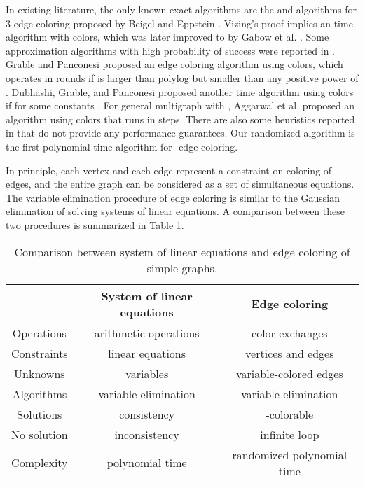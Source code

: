 \documentclass[11pt]{article}
\begin{document}
In existing literature, the only known exact algorithms are the  and  algorithms for 3-edge-coloring proposed by Beigel and Eppstein \cite{eppstein2001improved} \cite{beigel19953}. Vizing's proof implies an  time algorithm with  colors, which was later improved to  by Gabow et al. \cite{Gabowedgecoliring}. Some approximation algorithms with high probability of success were reported in \cite{grable1997nearly} \cite{dubhashi1998near} \cite{aggarwal2003switch}. Grable and Panconesi \cite{grable1997nearly} proposed an edge coloring algorithm using  colors, which operates in  rounds if  is larger than polylog but smaller than any positive power of . Dubhashi, Grable, and Panconesi \cite{dubhashi1998near} proposed another  time algorithm using  colors if  for some constants . For general multigraph with , Aggarwal et al. \cite{aggarwal2003switch} proposed an algorithm using  colors that runs in  steps. There are also some heuristics reported in \cite{hilgemeier2003fast} that do not provide any performance guarantees. Our randomized algorithm is the first polynomial time algorithm for -edge-coloring.


In principle, each vertex  and each edge  represent a constraint on coloring of edges, and the entire graph  can be considered as a set of simultaneous equations. The variable elimination procedure of edge coloring is similar to the Gaussian elimination of solving systems of linear equations. A comparison between these two procedures is summarized in Table \ref{tab:comp}.
\begin{table}[htpb]
	\centering
	{\footnotesize
		\begin{tabular}{|c || c| c| }
			\hline 
			& System of linear equations & Edge coloring \\
			\hline \hline 
			Operations & arithmetic operations & color exchanges \\ \hline 
			Constraints	& linear equations & vertices and edges \\ \hline 
			Unknowns & variables &  variable-colored edges \\ \hline 
			Algorithms &	variable elimination & variable elimination\\ \hline 
			Solutions	& consistency &	-colorable\\ \hline 
			No solution & inconsistency & infinite loop \\ \hline 
			Complexity & polynomial time & randomized polynomial time\\ 
			\hline		
		\end{tabular}	
		}
		\caption{Comparison between system of linear equations and edge coloring of simple graphs. }
	\label{tab:comp}
\end{table}
\end{document}
